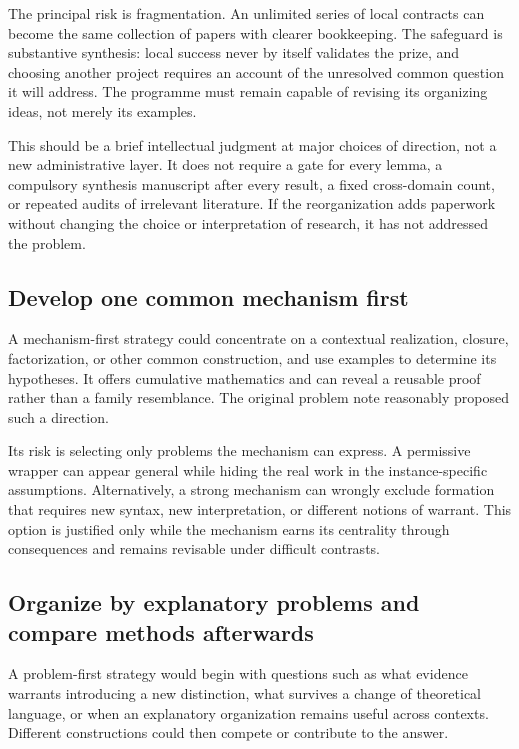 \documentclass[11pt]{article}
\begin{document}
The principal risk is fragmentation. An unlimited series of local contracts can become the same collection of papers with clearer bookkeeping. The safeguard is substantive synthesis: local success never by itself validates the prize, and choosing another project requires an account of the unresolved common question it will address. The programme must remain capable of revising its organizing ideas, not merely its examples.

This should be a brief intellectual judgment at major choices of direction, not a new administrative layer. It does not require a gate for every lemma, a compulsory synthesis manuscript after every result, a fixed cross-domain count, or repeated audits of irrelevant literature. If the reorganization adds paperwork without changing the choice or interpretation of research, it has not addressed the problem.

\subsection{Develop one common mechanism first}

A mechanism-first strategy could concentrate on a contextual realization, closure, factorization, or other common construction, and use examples to determine its hypotheses. It offers cumulative mathematics and can reveal a reusable proof rather than a family resemblance. The original problem note reasonably proposed such a direction.

Its risk is selecting only problems the mechanism can express. A permissive wrapper can appear general while hiding the real work in the instance-specific assumptions. Alternatively, a strong mechanism can wrongly exclude formation that requires new syntax, new interpretation, or different notions of warrant. This option is justified only while the mechanism earns its centrality through consequences and remains revisable under difficult contrasts.

\subsection{Organize by explanatory problems and compare methods afterwards}

A problem-first strategy would begin with questions such as what evidence warrants introducing a new distinction, what survives a change of theoretical language, or when an explanatory organization remains useful across contexts. Different constructions could then compete or contribute to the answer.
\end{document}
